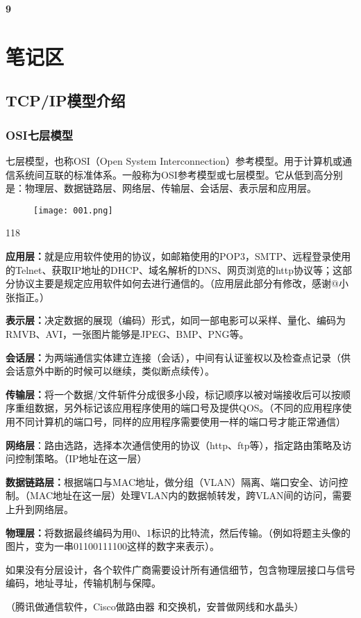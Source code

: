 \documentclass[cn,chinese,color=cyan]{elegantbook}
\begin{document}
\textbf{9}





\chapter{笔记区}
\section{TCP/IP模型介绍}

\subsection{OSI七层模型}
七层模型，也称OSI（Open System Interconnection）参考模型。用于计算机或通信系统间互联的标准体系。一般称为OSI参考模型或七层模型。它从低到高分别是：物理层、数据链路层、网络层、传输层、会话层、表示层和应用层。
\begin{figure}[H]
	\centering
	\texttt{[image: 001.png]}
\end{figure}
\begin{dinglist}{118}
	\item \textbf{应用层：}就是应用软件使用的协议，如邮箱使用的POP3，SMTP、远程登录使用的Telnet、获取IP地址的DHCP、域名解析的DNS、网页浏览的http协议等；这部分协议主要是规定应用软件如何去进行通信的。（应用层此部分有修改，感谢@小张指正。）
	
	 \item \textbf{表示层：}决定数据的展现（编码）形式，如同一部电影可以采样、量化、编码为RMVB、AVI，一张图片能够是JPEG、BMP、PNG等。
	 
	 \item \textbf{会话层：}为两端通信实体建立连接（会话），中间有认证鉴权以及检查点记录（供会话意外中断的时候可以继续，类似断点续传）。
	 
	 \item \textbf{传输层：}将一个数据/文件斩件分成很多小段，标记顺序以被对端接收后可以按顺序重组数据，另外标记该应用程序使用的端口号及提供QOS。（不同的应用程序使用不同计算机的端口号，同样的应用程序需要使用一样的端口号才能正常通信）
	 
	 \item \textbf{网络层}：路由选路，选择本次通信使用的协议（http、ftp等），指定路由策略及访问控制策略。（IP地址在这一层）
	 
	 \item \textbf{数据链路层：}根据端口与MAC地址，做分组（VLAN）隔离、端口安全、访问控制。（MAC地址在这一层）处理VLAN内的数据帧转发，跨VLAN间的访问，需要上升到网络层。
	 
	 \item \textbf{物理层：}将数据最终编码为用0、1标识的比特流，然后传输。（例如将题主头像的图片，变为一串01100111100这样的数字来表示）。
\end{dinglist}
\begin{warning}[title={{\color{green} \faEnvira} 为什么需要分层设计：\ }]
	如果没有分层设计，各个软件广商需要设计所有通信细节，包含物理层接口与信号编码，地址寻址，传输机制与保障。
	
	（腾讯做通信软件，Cisco做路由器 和交换机，安普做网线和水晶头）
\end{warning}
\end{document}

